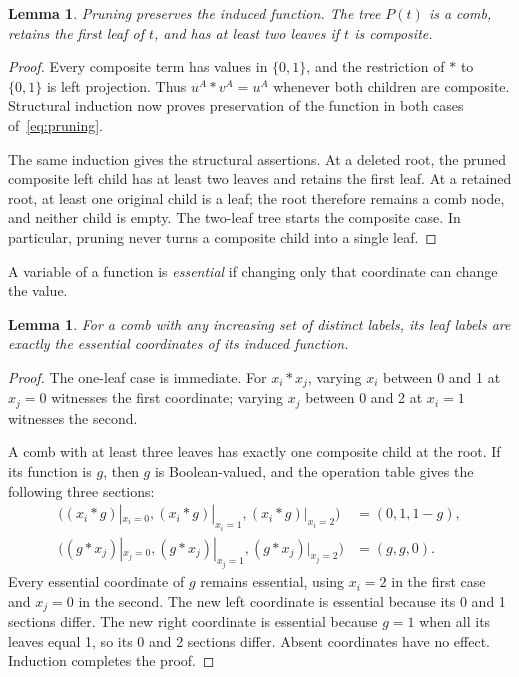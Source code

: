 \documentclass[11pt]{amsart}
\newtheorem{lemma}[theorem]{Lemma}
\begin{document}
\begin{lemma}\label{lem:pruning}
Pruning preserves the induced function. The tree \(P(t)\) is a comb,
retains the first leaf of \(t\), and has at least two leaves if \(t\)
is composite.
\end{lemma}
\begin{proof}
Every composite term has values in \(\{0,1\}\), and the restriction of
\(*\) to \(\{0,1\}\) is left projection. Thus \(u^A*v^A=u^A\)
whenever both children are composite. Structural induction now proves
preservation of the function in both cases of~\eqref{eq:pruning}.

The same induction gives the structural assertions. At a deleted root,
the pruned composite left child has at least two leaves and retains the
first leaf. At a retained root, at least one original child is a leaf;
the root therefore remains a comb node, and neither child is empty.
The two-leaf tree starts the composite case. In particular, pruning never
turns a composite child into a single leaf.
\end{proof}

A variable of a function is \emph{essential} if changing only that
coordinate can change the value.

\begin{lemma}\label{lem:essential}
For a comb with any increasing set of distinct labels, its leaf labels
are exactly the essential coordinates of its induced function.
\end{lemma}
\begin{proof}
The one-leaf case is immediate. For \(x_i*x_j\), varying \(x_i\)
between 0 and 1 at \(x_j=0\) witnesses the first coordinate;
varying \(x_j\) between 0 and 2 at \(x_i=1\) witnesses the second.

A comb with at least three leaves has exactly one composite child at
the root. If its function is \(g\), then \(g\) is Boolean-valued,
and the operation table gives the following three sections:
\begin{equation}\label{eq:sections}
\begin{aligned}
 \bigl((x_i*g)|_{x_i=0},(x_i*g)|_{x_i=1},(x_i*g)|_{x_i=2}\bigr)
   &=(0,1,1-g),\\
 \bigl((g*x_j)|_{x_j=0},(g*x_j)|_{x_j=1},(g*x_j)|_{x_j=2}\bigr)
   &=(g,g,0).
\end{aligned}
\end{equation}
Every essential coordinate of \(g\) remains essential, using \(x_i=2\)
in the first case and \(x_j=0\) in the second. The new left coordinate
is essential because its 0 and 1 sections differ. The new right coordinate
is essential because \(g=1\) when all its leaves equal 1, so its 0 and 2
sections differ. Absent coordinates have no effect. Induction completes
the proof.
\end{proof}
\end{document}
